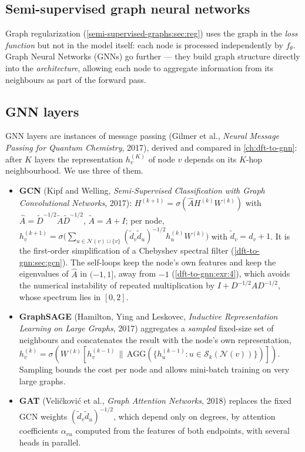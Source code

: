 \begin{notechapter}
\section{Semi-supervised graph neural networks}
\label{semi-supervised-graphs:sec:gnn}

Graph regularization (\cref{semi-supervised-graphs:sec:reg}) uses the graph in the
\emph{loss function} but not in the model itself: each node is processed
independently by $f_\theta$. Graph Neural Networks (GNNs) go further --- they
build graph structure directly into the \emph{architecture}, allowing each
node to aggregate information from its neighbours as part of the forward pass.

\subsection{GNN layers}

GNN layers are instances of message passing (Gilmer et al., \emph{Neural Message Passing for Quantum Chemistry}, 2017), derived and compared in \cref{ch:dft-to-gnn}: after $K$ layers the representation $h_v^{(K)}$ of node $v$ depends on its $K$-hop neighbourhood. We use three of them.
\begin{itemize}
\item \textbf{GCN} (Kipf and Welling, \emph{Semi-Supervised Classification with Graph Convolutional Networks}, 2017): $H^{(k+1)} = \sigma(\hat AH^{(k)}W^{(k)})$ with $\hat A = \tilde D^{-1/2}\tilde A\tilde D^{-1/2}$, $\tilde A = A + I$; per node, $h_v^{(k+1)} = \sigma\bigl(\sum_{u\in\mathcal N(v)\cup\{v\}}(\tilde d_v\tilde d_u)^{-1/2}h_u^{(k)}W^{(k)}\bigr)$ with $\tilde d_v = d_v + 1$. It is the first-order simplification of a Chebyshev spectral filter (\cref{dft-to-gnn:sec:gcn}). The self-loops keep the node's own features and keep the eigenvalues of $\hat A$ in $(-1, 1]$, away from $-1$ (\cref{dft-to-gnn:exr:4}), which avoids the numerical instability of repeated multiplication by $I + D^{-1/2}AD^{-1/2}$, whose spectrum lies in $[0, 2]$.
\item \textbf{GraphSAGE} (Hamilton, Ying and Leskovec, \emph{Inductive Representation Learning on Large Graphs}, 2017) aggregates a \emph{sampled} fixed-size set of neighbours and concatenates the result with the node's own representation, $h_v^{(k)} = \sigma(W^{(k)}[h_v^{(k-1)}\,\|\,\mathrm{AGG}(\{h_u^{(k-1)}: u\in\mathcal S_k(\mathcal N(v))\})])$. Sampling bounds the cost per node and allows mini-batch training on very large graphs.
\item \textbf{GAT} (Veličković et al., \emph{Graph Attention Networks}, 2018) replaces the fixed GCN weights $(\tilde d_v\tilde d_u)^{-1/2}$, which depend only on degrees, by attention coefficients $\alpha_{vu}$ computed from the features of both endpoints, with several heads in parallel.
\end{itemize}


\end{notechapter}
